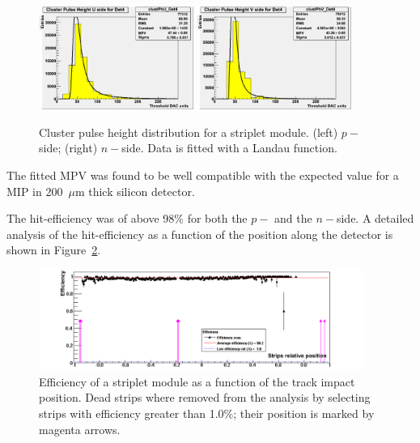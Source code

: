 \begin{figure}[!htpb]
\centering
\includegraphics[width=0.45\textwidth]{p_side_striplets.png}
\includegraphics[width=0.45\textwidth]{n_side_striplets.png}
\caption{\label{fig:clu_ph_striplets}Cluster pulse height distribution for a striplet module. (left) $p-$ side; 
(right) $n-$side. Data is fitted with a Landau function.}
\end{figure}

The fitted MPV was found to be well compatible with the expected  value for a MIP in 200~$\mu$m 
thick silicon detector.

The hit-efficiency was of above 98\% for both the $p-$ and the $n-$side. A detailed analysis 
of the hit-efficiency as a function of the position along the detector is shown in 
Figure~\ref{fig:striplets_eff}.


\begin{figure}[!htpb]
\centering
\includegraphics[width=0.95\textwidth]{striplets_eff.png}
\caption{\label{fig:striplets_eff}Efficiency of a striplet module as a function of the track impact position. 
Dead strips where removed from the analysis by selecting strips with efficiency greater than 1.0\%; 
their position is marked by magenta arrows.}
\end{figure}

